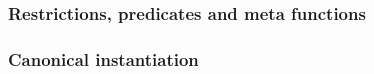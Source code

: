 



\subsubsection{Restrictions, predicates and meta functions}









\subsubsection{Canonical instantiation}

